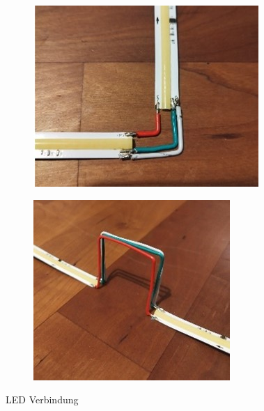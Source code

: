 \begin{figure}[H]
    \centering
    \begin{subfigure}[b]{0.52\textwidth}
        \centering
        \includegraphics[width=\textwidth]{image/led1.jpg}
        
        \label{fig:bild1}
    \end{subfigure}
    \hfill
    \begin{subfigure}[b]{0.45\textwidth}
        \centering
        \includegraphics[width=\textwidth]{image/led2.jpg}
       
        \label{fig:bild2}
    \end{subfigure}
    \caption{LED Verbindung}
    \label{fig:zwei_bilder}
\end{figure}
 